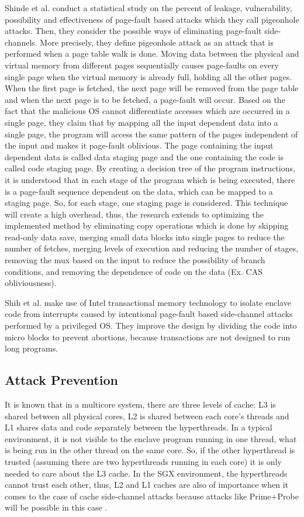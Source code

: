 Shinde et al. \cite{pigeonhole} conduct a statistical study on the percent of leakage, vulnerability, possibility and effectiveness of page-fault based attacks which they call pigeonhole attacks. Then, they consider the possible ways of eliminating page-fault side-channels. More precisely, they define pigeonhole attack as an attack that is performed when a page table walk is done. Moving data between the physical and virtual memory from different pages sequentially causes page-faults on every single page when the virtual memory is already full, holding all the other pages. When the first page is fetched, the next page will be removed from the page table and when the next page is to be fetched, a page-fault will occur. Based on the fact that the malicious OS cannot differentiate accesses which are occurred in a single page, they claim that by mapping all the input dependent data into a single page, the program will access the same pattern of the pages independent of the input and makes it page-fault oblivious. The page containing the input dependent data is called data staging page and the one containing the code is called code staging page. By creating a decision tree of the program instructions, it is understood that in each stage of the program which is being executed, there is a page-fault sequence dependent on the data, which can be mapped to a staging page. So, for each stage, one staging page is considered. This technique will create a high overhead, thus, the research extends to optimizing the implemented method by eliminating copy operations which is done by skipping read-only data save, merging small data blocks into single pages to reduce the number of fetches, merging levels of execution and reducing the number of stages, removing the mux based on the input to reduce the possibility of branch conditions, and removing the dependence of code on the data (Ex. CAS obliviousness).

Shih et al. \cite{tsgx} make use of Intel transactional memory technology to isolate enclave code from interrupts caused by intentional page-fault based side-channel attacks performed by a privileged OS. They improve the design by dividing the code into micro blocks to prevent abortions, because transactions are not designed to run long programs.


\subsection{Attack Prevention}%
It is known that in a multicore system, there are three levels of cache: L3 is shared between all physical cores, L2 is shared between each core's threads and L1 shares data and code separately between the hyperthreads. In a typical environment, it is not visible to the enclave program running in one thread, what is being run in the other thread on the same core. So, if the other hyperthread is trusted (assuming there are two hyperthreads running in each core) it is only needed to care about the L3 cache. In the SGX environment, the hyperthreads cannot trust each other, thus, L2 and L1 caches are also of importance when it comes to the case of cache side-channel attacks because attacks like Prime+Probe will be possible in this case \cite{cloak}.

